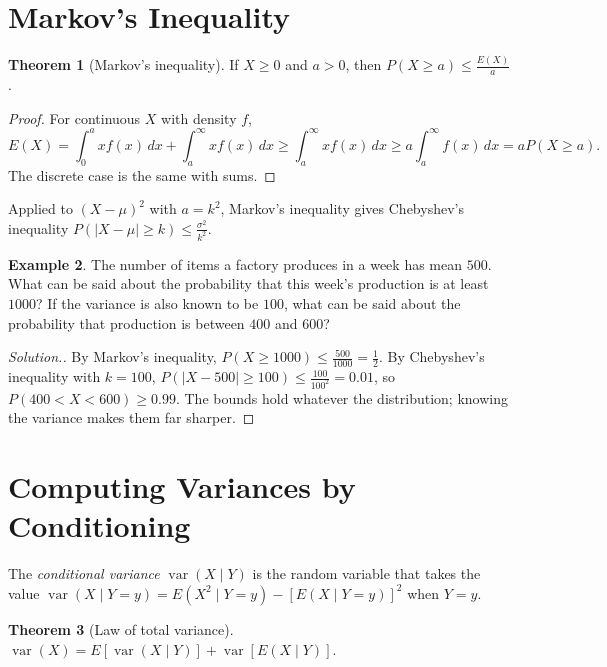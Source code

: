 \documentclass[12pt,a4paper]{report}
\theoremstyle{definition}
\newtheorem{thm}{Theorem}[section]
\newtheorem{exa}[thm]{Example}
\DeclareMathOperator{\var}{var}
\newenvironment{solution}
  {\renewcommand{\qedsymbol}{}\begin{proof}[\textit{Solution}.]}
  {\end{proof}}
\begin{document}
\section{Markov's Inequality}

\begin{thm}[Markov's inequality]
\label{thm:markovineq}
If $X\geq 0$ and $a>0$, then $P(X\geq a)\leq\frac{E(X)}{a}$.
\end{thm}

\begin{proof}
For continuous $X$ with density $f$,
\[E(X) = \int_0^ax f(x)\,dx + \int_a^\infty xf(x)\,dx\geq\int_a^\infty xf(x)\,dx\geq a\int_a^\infty f(x)\,dx = aP(X\geq a) .\]
The discrete case is the same with sums.
\end{proof}

Applied to $(X - \mu)^2$ with $a = k^2$, Markov's inequality gives Chebyshev's inequality
$P(|X - \mu|\geq k)\leq\frac{\sigma^2}{k^2}$.

\begin{exa}
\label{ex:production}
The number of items a factory produces in a week has mean $500$. What can be said about the
probability that this week's production is at least $1000$? If the variance is also known
to be $100$, what can be said about the probability that production is between $400$ and
$600$?
\end{exa}

\begin{solution}
By Markov's inequality, $P(X\geq 1000)\leq\frac{500}{1000} = \frac12$. By Chebyshev's inequality
with $k = 100$, $P(|X - 500|\geq 100)\leq\frac{100}{100^2} = 0.01$, so
$P(400<X<600)\geq 0.99$. The bounds hold whatever the distribution; knowing the variance
makes them far sharper.
\end{solution}

\section{Computing Variances by Conditioning}

The \emph{conditional variance} $\var(X\mid Y)$ is the random variable that takes the value
$\var(X\mid Y = y) = E(X^2\mid Y = y) - \left[E(X\mid Y = y)\right]^2$ when $Y = y$.

\begin{thm}[Law of total variance]
\label{thm:totalvariance}
$\var(X) = E\left[\var(X\mid Y)\right] + \var\left[E(X\mid Y)\right]$.
\end{thm}
\end{document}
